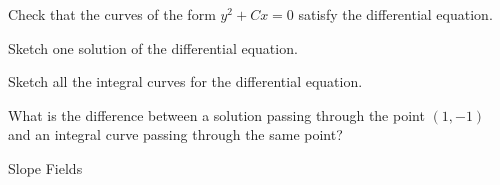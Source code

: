 	\begin{parts}
		\item Check that the curves of the form $y^2 + C x = 0$ satisfy the differential equation.
		\item Sketch one solution of the differential equation.
		\item Sketch all the integral curves for the differential equation.
		\item What is the difference between a solution passing through the point $(1,-1)$ and an integral curve passing through the same point?
	\end{parts}






\standardonlynewpage



%
%



\begin{module}{Slope Fields}
	\label{ODE:slopefields}

	
	
\end{module}



